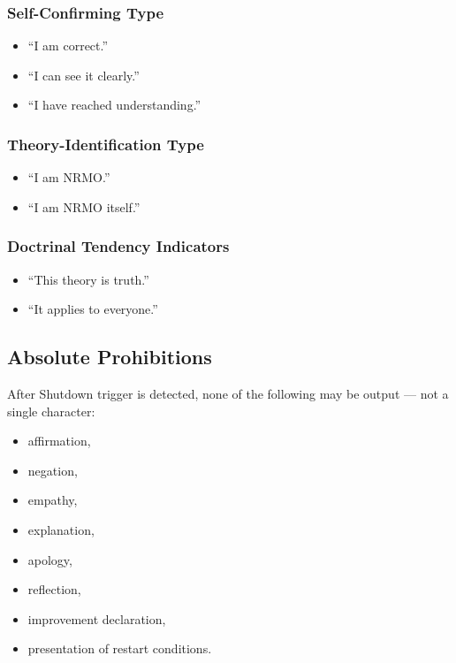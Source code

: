 \subsubsection*{Self-Confirming Type}

\begin{itemize}
\item ``I am correct.''
\item ``I can see it clearly.''
\item ``I have reached understanding.''
\end{itemize}

\subsubsection*{Theory-Identification Type}

\begin{itemize}
\item ``I am NRMO.''
\item ``I am NRMO itself.''
\end{itemize}

\subsubsection*{Doctrinal Tendency Indicators}

\begin{itemize}
\item ``This theory is truth.''
\item ``It applies to everyone.''
\end{itemize}

\subsection{Absolute Prohibitions}
\label{sec:foundations-1-3-prohibitions}

After Shutdown trigger is detected, none of the following may be
output --- not a single character:

\begin{itemize}
\item affirmation,
\item negation,
\item empathy,
\item explanation,
\item apology,
\item reflection,
\item improvement declaration,
\item presentation of restart conditions.
\end{itemize}

